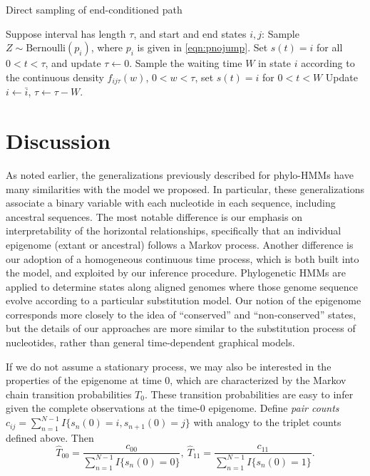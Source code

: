 \documentclass[11pt]{article}
\begin{document}
\begin{algorithm}[t]
  \begin{algorithmic}[1]
    \caption{Direct sampling of end-conditioned path}\label{alg:samplepath}
    \STATE Suppose interval has length $\tau$, and start and end states $i, j$:
    \STATE Sample $Z\sim \text{Bernoulli}(p_i)$, where
    $p_i$ is given in \eqref{eqn:pnojump}.
    \STATE Set $s(t) = i$ for all $0 < t < \tau$, and update $\tau \leftarrow 0$.
    \ENDIF
    \ENDIF
    \STATE Sample the waiting time $W$ in state $i$ according to the continuous
    density $f_{ij\tau}(w)$, $0< w < \tau$, set $s(t) = i$ for $0 < t < W$
    \STATE Update $i \leftarrow \bar{i}$, $\tau \leftarrow \tau - W$.
    \ENDIF
    \ENDWHILE
  \end{algorithmic}
\end{algorithm}


\section{Discussion}

As noted earlier, the generalizations previously described for
phylo-HMMs have many similarities with the model we proposed. In
particular, these generalizations associate a binary variable with
each nucleotide in each sequence, including ancestral sequences.  The
most notable difference is our emphasis on interpretability of the
horizontal relationships, specifically that an individual epigenome
(extant or ancestral) follows a Markov process. Another difference is
our adoption of a homogeneous continuous time process, which is both
built into the model, and exploited by our inference
procedure. Phylogenetic HMMs are applied to determine states along
aligned genomes where those genome sequence evolve according to a
particular substitution model. Our notion of the epigenome corresponds
more closely to the idea of ``conserved'' and ``non-conserved''
states, but the details of our approaches are more similar to the
substitution process of nucleotides, rather than general
time-dependent graphical models.

\clearpage




\clearpage

If we do not assume a stationary process, we may also be interested in
the properties of the epigenome at time 0, which are characterized by
the Markov chain transition
probabilities $T_{0}$. These transition probabilities are easy to
infer given the complete observations at the time-0 epigenome.  Define
{\it pair counts} $c_{ij} = \sum_{n=1}^{N-1}I\{s_n(0) =i,
s_{n+1}(0)=j\}$ with analogy to the triplet counts defined above. Then
\[
\hat{T}_{00} = \frac{c_{00}}{\sum_{n=1}^{N-1}I\{s_n(0) = 0\}}, ~
\hat{T}_{11} = \frac{c_{11}}{\sum_{n=1}^{N-1}I\{s_n(0) = 1\}}.
\]
\end{document}
